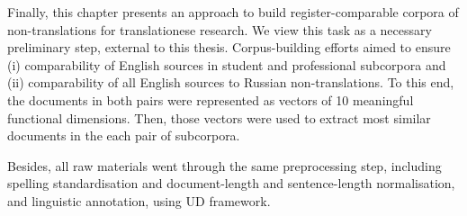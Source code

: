 Finally, this chapter presents an approach to build register-comparable corpora of non-translations for translationese research. We view this task as a necessary preliminary step, external to this thesis. Corpus-building efforts aimed to ensure (i) comparability of English sources in student and professional subcorpora and (ii) comparability of all English sources to Russian non-translations. To this end, the documents in both pairs were represented as vectors of 10 meaningful functional dimensions. Then, those vectors were used to extract most similar documents in the each pair of subcorpora.

Besides, all raw materials went through the same preprocessing step, including spelling standardisation and document-length and sentence-length normalisation, and linguistic annotation, using UD framework.